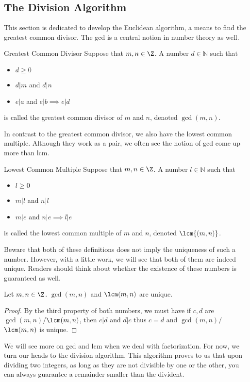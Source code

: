 \subsection{The Division Algorithm}
This section is dedicated to develop the Euclidean algorithm, a means to find the greatest common divisor. The gcd is a central notion in number theory as well. 
\begin{defn}{Greatest Common Divisor}{} Suppose that $m,n\in\Z$. A number $d\in\mathbb{N}$ such that 
\begin{itemize}
\item $d\geq 0$
\item $d|m$ and $d|n$
\item $e|a$ and $e|b\implies e|d$
\end{itemize}
is called the greatest common divisor of $m$ and $n$, denoted $\gcd{(m,n)}$.
\end{defn}

In contrast to the greatest common divisor, we also have the lowest common multiple. Although they work as a pair, we often see the notion of gcd come up more than lcm. 

\begin{defn}{Lowest Common Multiple}{} Suppose that $m,n\in\Z$. A number $l\in\mathbb{N}$ such that 
\begin{itemize}
\item $l\geq 0$
\item $m|l$ and $n|l$
\item $m|e$ and $n|e\implies l|e$
\end{itemize}
is called the lowest common multiple of $m$ and $n$, denoted $\lcm{(m,n)}$.
\end{defn}

Beware that both of these definitions does not imply the uniqueness of such a number. However, with a little work, we will see that both of them are indeed unique. Readers should think about whether the existence of these numbers is guaranteed as well. 

\begin{prp}{}{} Let $m,n\in\Z$. $\gcd(m,n)$ and $\lcm(m,n)$ are unique. \tcbline
\begin{proof}
By the third property of both numbers, we must have if $c,d$ are $\gcd(m,n)$/$\lcm(m,n)$, then $c|d$ and $d|c$ thus $c=d$ and $\gcd(m,n)$/$\lcm(m,n)$ is unique. 
\end{proof}
\end{prp}

We will see more on gcd and lcm when we deal with factorization. For now, we turn our heads to the division algorithm. This algorithm proves to us that upon dividing two integers, as long as they are not divisible by one or the other, you can always guarantee a remainder smaller than the divident. 


